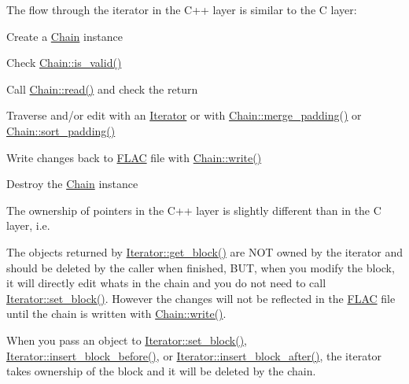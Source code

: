 The flow through the iterator in the C++ layer is similar to the C layer\+:
\begin{DoxyItemize}
\item Create a \hyperlink{class_f_l_a_c_1_1_metadata_1_1_chain}{Chain} instance
\item Check \hyperlink{class_f_l_a_c_1_1_metadata_1_1_chain_a7c7799a4ed676ac334381af9e3888549}{Chain\+::is\+\_\+valid()}
\item Call \hyperlink{class_f_l_a_c_1_1_metadata_1_1_chain_a509bf6a75a12df65bc77947a4765d9c1}{Chain\+::read()} and check the return
\item Traverse and/or edit with an \hyperlink{class_f_l_a_c_1_1_metadata_1_1_iterator}{Iterator} or with \hyperlink{class_f_l_a_c_1_1_metadata_1_1_chain_aef51a0414284f468a2d73c07b540641d}{Chain\+::merge\+\_\+padding()} or \hyperlink{class_f_l_a_c_1_1_metadata_1_1_chain_a779eaac12da7e7edac67089053e5907f}{Chain\+::sort\+\_\+padding()}
\item Write changes back to \hyperlink{namespace_f_l_a_c}{F\+L\+AC} file with \hyperlink{class_f_l_a_c_1_1_metadata_1_1_chain_a2341690885e2312013afc561e6fafd81}{Chain\+::write()}
\item Destroy the \hyperlink{class_f_l_a_c_1_1_metadata_1_1_chain}{Chain} instance
\end{DoxyItemize}

The ownership of pointers in the C++ layer is slightly different than in the C layer, i.\+e.
\begin{DoxyItemize}
\item The objects returned by \hyperlink{class_f_l_a_c_1_1_metadata_1_1_iterator_a9fb167ff8f0b058e244353a21541f3d7}{Iterator\+::get\+\_\+block()} are N\+OT owned by the iterator and should be deleted by the caller when finished, B\+UT, when you modify the block, it will directly edit what\textquotesingle{}s in the chain and you do not need to call \hyperlink{class_f_l_a_c_1_1_metadata_1_1_iterator_a3123daf89fca2a8981c9f361f466a418}{Iterator\+::set\+\_\+block()}. However the changes will not be reflected in the \hyperlink{namespace_f_l_a_c}{F\+L\+AC} file until the chain is written with \hyperlink{class_f_l_a_c_1_1_metadata_1_1_chain_a2341690885e2312013afc561e6fafd81}{Chain\+::write()}.
\item When you pass an object to \hyperlink{class_f_l_a_c_1_1_metadata_1_1_iterator_a3123daf89fca2a8981c9f361f466a418}{Iterator\+::set\+\_\+block()}, \hyperlink{class_f_l_a_c_1_1_metadata_1_1_iterator_a86de6d0b21ac08b74a2ea8c1a9adce36}{Iterator\+::insert\+\_\+block\+\_\+before()}, or \hyperlink{class_f_l_a_c_1_1_metadata_1_1_iterator_a73e7a3f7192f369cb3a19d078da504ab}{Iterator\+::insert\+\_\+block\+\_\+after()}, the iterator takes ownership of the block and it will be deleted by the chain.
\end{DoxyItemize}

